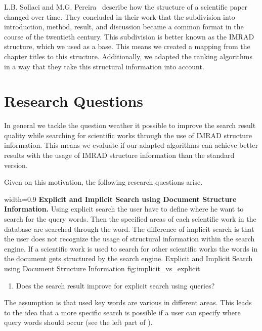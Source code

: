  L.B. Sollaci and M.G. Pereira~\cite{Sollaci-The-2004} describe how the structure of a scientific paper changed over time. They concluded in their work that the subdivision into introduction, method, result, and discussion became a common format in the course of the twentieth century. This subdivision is better known as the IMRAD structure, which we used as a base. This means we created a mapping from the chapter titles to this structure. Additionally, we adapted the ranking algorithms in a way that they take this structural information into account.


\section{Research Questions}
\label{sec:research_questions}

In general we tackle the question weather it possible to improve the search result quality while searching for scientific works through the use of IMRAD structure information. This means we evaluate if our adapted algorithms can achieve better results with the usage of IMRAD structure information than the standard version.

Given on this motivation, the following research questions arise.

      {width=0.9\textwidth}
      {\textbf{Explicit and Implicit Search using Document Structure Information.} Using explicit search the user have to define where he want to search for the query words. Then the specified areas of each scientific work in the database are searched through the word. The difference of implicit search is that the user does not recognize the usage of structural information within the search engine. If a scientific work is used to search for other scientific works the words in the document gets structured by the search engine.}
      {Explicit and Implicit Search using Document Structure Information}
      {fig:implicit_vs_explicit}

\begin{enumerate}
  \item Does the search result improve for explicit search using queries?
\end{enumerate}

The assumption is that used key words are various in different areas. This leads to the idea that a more specific search is possible if a user can specify where query words should occur (see the left part of ).

